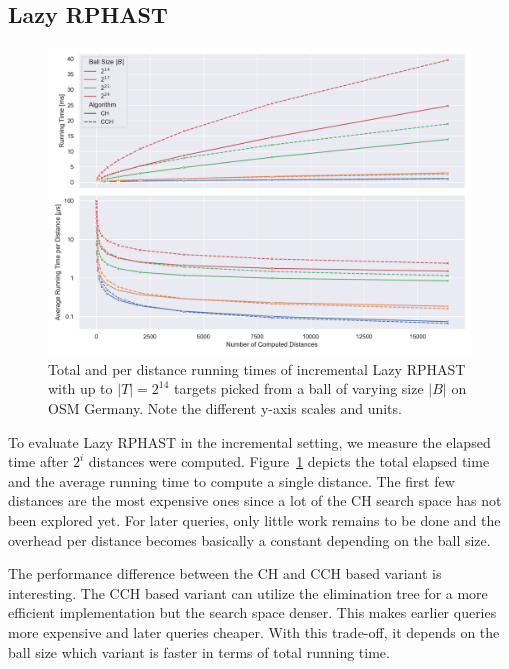 \documentclass[manuscript,review]{acmart}
\begin{document}
\subsection{Lazy RPHAST}\label{sec:exp_lazy_rphast}

\begin{figure}
\centering
\includegraphics[width=\linewidth]{fig/lazy_rphast_inc.pdf}
\caption{
Total and per distance running times of incremental Lazy RPHAST with up to $|T| = 2^{14}$ targets picked from a ball of varying size $|B|$ on OSM Germany.
Note the different y-axis scales and units.
}\label{fig:lazy_rphast_inc}
\end{figure}

To evaluate Lazy RPHAST in the incremental setting, we measure the elapsed time after $2^i$ distances were computed.
Figure~\ref{fig:lazy_rphast_inc} depicts the total elapsed time and the average running time to compute a single distance.
The first few distances are the most expensive ones since a lot of the CH search space has not been explored yet.
For later queries, only little work remains to be done and the overhead per distance becomes basically a constant depending on the ball size.

The performance difference between the CH and CCH based variant is interesting.
The CCH based variant can utilize the elimination tree for a more efficient implementation but the search space denser.
This makes earlier queries more expensive and later queries cheaper.
With this trade-off, it depends on the ball size which variant is faster in terms of total running time.
\end{document}
